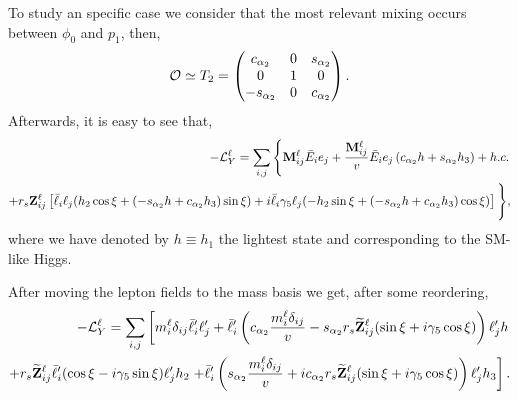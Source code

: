 \documentclass[aps,prd,groupaddress,floatfix,tighten,nofootinbib,showpacs,
amsfonts,superscriptaddress]{revtex4}
\begin{document}
To study an specific case we consider that the most relevant mixing occurs between $\phi_0$ and $p_1$, then,
%
\begin{eqnarray}
		{\cal O} \simeq T_2 = \begin{pmatrix}
			c_{\alpha_2} & 0 & s_{\alpha_2} \\
			0 &  1 & 0 \\
			-s_{\alpha_2} & 0 & c_{\alpha_2}
		\end{pmatrix}.
\end{eqnarray}
%
Afterwards, it is easy to see that,
%
\begin{eqnarray} \begin{split}
		-{\cal L}_Y^\ell = \sum_{i,j} \left \lbrace {\bf M}^\ell_{ij} 
		\bar{E}_{i} e_j  +  \frac{{\bf M}^\ell_{ij}}{v} \bar{E}_{i} e_j  \left( c_{\alpha_2} h + s_{\alpha_2} h_3 \right) +  h.c.
		 \right. \\
		 + r_s {\bf Z}_{ij}^\ell \left[  \bar{\ell}_{i} \ell_j  ( h_2  \cos \xi +  \left( -s_{\alpha_2} h + c_{\alpha_2} h_3 \right)   \sin \xi )
	+  i \bar{\ell}_{i} \gamma_5 \ell_j  (- h_2  \sin \xi + \left( -s_{\alpha_2} h + c_{\alpha_2} h_3 \right)  \cos \xi ) \right] 
		 \Bigg \rbrace, \end{split}
\end{eqnarray}	
%
where we have denoted by $h \equiv h_1$ the lightest state and corresponding to the SM-like Higgs. 
	
After moving the lepton fields to the mass basis we get, after some reordering,
%
\begin{eqnarray} \begin{split}
-{\cal L}_Y^\ell = \sum_{i,j} \left[ m_i^\ell \delta_{ij} 
\bar{\ell}'_{i} \ell'_j  + \bar{\ell}'_{i}  \left(c_{\alpha_2} \frac{m_i^\ell \delta_{ij}}{v}
-s_{\alpha_2} r_s \widetilde{\bf Z}_{ij}^\ell (\sin\xi + i \gamma_5 \cos\xi)
\right) 	\ell'_j h \right. \\
 + r_s \widetilde{\bf Z}_{ij}^\ell  \bar{\ell}'_{i} (\cos\xi - i \gamma_5 \sin \xi) \ell'_j h_2  \left. 
 +\bar{\ell}'_{i}  \left(s_{\alpha_2} \frac{m_i^\ell \delta_{ij}}{v}
+ic_{\alpha_2} r_s \widetilde{\bf Z}_{ij}^\ell  (\sin\xi + i \gamma_5 \cos \xi)
\right) \ell'_j h_3 \right].
\end{split}
\end{eqnarray}
%
	
\end{document}
